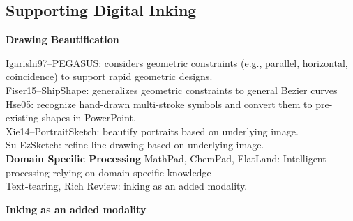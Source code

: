 \subsection{Supporting Digital Inking}
\textbf{Drawing Beautification}

Igarishi97--PEGASUS: considers geometric constraints (e.g., parallel, horizontal, coincidence) to support rapid geometric designs.\\
Fiser15--ShipShape: generalizes geometric constraints to general Bezier curves\\
Hse05: recognize hand-drawn multi-stroke symbols and convert them to pre-existing shapes in PowerPoint.\\
Xie14--PortraitSketch: beautify portraits based on underlying image.\\
Su-EzSketch: refine line drawing based on underlying image.\\
 
\textbf{Domain Specific Processing} 
MathPad, ChemPad, FlatLand: Intelligent processing relying on domain specific knowledge\\
Text-tearing, Rich Review: inking as an added modality.

\textbf{Inking as an added modality}